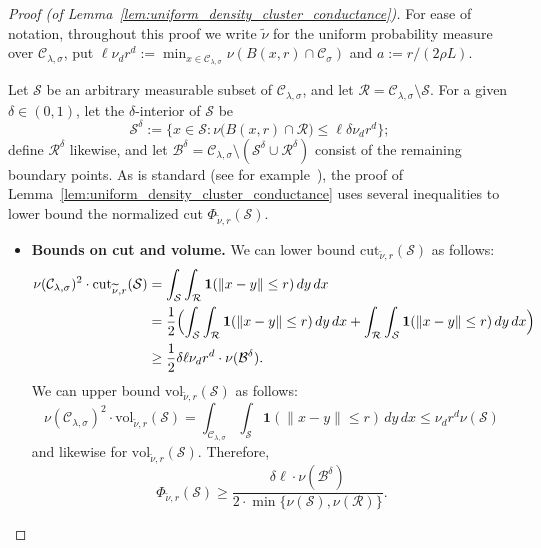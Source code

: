 \documentclass{article}
\newcommand{\vol}{\mathrm{vol}}
\newcommand{\cut}{\mathrm{cut}}
\newcommand{\1}{\mathbf{1}}
\newcommand{\mc}[1]{\mathcal{#1}}
\newcommand{\wt}[1]{\widetilde{#1}}
\theoremstyle{definition}
\theoremstyle{remark}
\begin{document}
\begin{proof}[Proof (of Lemma~\ref{lem:uniform_density_cluster_conductance})]
	For ease of notation, throughout this proof we write $\wt{\nu}$ for the uniform probability measure over $\mc{C}_{\lambda,\sigma}$, put $\ell \nu_d r^d := \min_{x \in \mc{C}_{\lambda,\sigma}}\nu(B(x,r) \cap \mc{C}_{\sigma})$ and $a := r/(2\rho L)$. 
	
	Let $\mc{S}$ be an arbitrary measurable subset of $\mc{C}_{\lambda,\sigma}$, and let $\mc{R} = \mc{C}_{\lambda,\sigma} \setminus \mc{S}$. For a given $\delta \in (0,1)$, let the $\delta$-interior of $\mc{S}$ be 
	\begin{equation*}
	\mc{S}^{\delta} := \{x \in \mc{S}: \nu\bigl(B(x,r) \cap \mc{R}\bigr) \leq \ell \delta \nu_d r^d\};
	\end{equation*}
	define $\mc{R}^{\delta}$ likewise, and let $\mc{B}^{\delta} = \mc{C}_{\lambda,\sigma} \setminus (\mc{S}^{\delta} \cup \mc{R}^{\delta})$ consist of the remaining boundary points.
	As is standard (see for example~\cite{dyer1991,lovasz1990}), the proof of Lemma~\ref{lem:uniform_density_cluster_conductance} uses several inequalities to lower bound the normalized cut $\Phi_{\wt{\nu},r}(\mc{S})$.
	\begin{itemize}
		\item \textbf{Bounds on cut and volume.}
		We can lower bound $\cut_{\wt{\nu},r}(\mc{S})$ as follows:
		\begin{align*}
		\nu(\mc{C}_{\lambda,\sigma})^2 \cdot \cut_{\wt{\nu},r}(\mc{S}) & = \int_{\mc{S}} \int_{\mc{R}} \1(\|x - y\| \leq r) \,dy \,dx \\
		& = \frac{1}{2}\Bigl(\int_{\mc{S}} \int_{\mc{R}} \1(\|x - y\| \leq r) \,dy \,dx + \int_{\mc{R}} \int_{\mc{S}} \1(\|x - y\| \leq r) \,dy \,dx\Bigr) \\
		& \geq \frac{1}{2} \delta \ell \nu_d r^d \cdot \nu(\mc{B}^{\delta}).
		\end{align*}
		We can upper bound $\vol_{\wt{\nu},r}(\mc{S})$ as follows:
		\begin{equation*}
		\nu(\mc{C}_{\lambda,\sigma})^2 \cdot \vol_{\wt{\nu},r}(\mc{S}) = \int_{\mc{C}_{\lambda,\sigma}} \int_{\mc{S}} \1(\|x - y\| \leq r) \,dy \,dx \leq \nu_d r^d \nu(\mc{S})
		\end{equation*}
		and likewise for $\vol_{\wt{\nu},r}(\mc{S})$. Therefore,
		\begin{equation}
		\label{pf:uniform_density_cluster_conductance_1}
		\Phi_{\wt{\nu},r}(\mc{S}) \geq \frac{\delta \ell \cdot \nu(\mc{B}^{\delta})}{2 \cdot \min\{\nu(\mc{S}), \nu(\mc{R})\}}.

\end{equation}
\end{itemize}
\end{proof}
\end{document}
